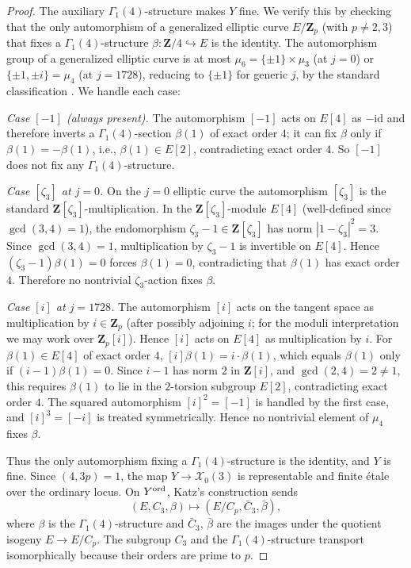 \documentclass[11pt]{amsart}
\theoremstyle{definition}
\theoremstyle{remark}
\newcommand{\Z}{\mathbf{Z}}
\begin{document}
\begin{proof}
The auxiliary $\Gamma_1(4)$-structure makes $Y$ fine. We verify this by checking that the only automorphism of a generalized elliptic curve $E/\Z_p$ (with $p\ne 2,3$) that fixes a $\Gamma_1(4)$-structure $\beta:\Z/4\hookrightarrow E$ is the identity. The automorphism group of a generalized elliptic curve is at most $\mu_6=\{\pm 1\}\times\mu_3$ (at $j=0$) or $\{\pm 1,\pm i\}=\mu_4$ (at $j=1728$), reducing to $\{\pm 1\}$ for generic $j$, by the standard classification \cite[\S 2.7]{KM85}. We handle each case:

\emph{Case $[-1]$ (always present).} The automorphism $[-1]$ acts on $E[4]$ as $-\mathrm{id}$ and therefore inverts a $\Gamma_1(4)$-section $\beta(1)$ of exact order $4$; it can fix $\beta$ only if $\beta(1)=-\beta(1)$, i.e., $\beta(1)\in E[2]$, contradicting exact order $4$. So $[-1]$ does not fix any $\Gamma_1(4)$-structure.

\emph{Case $[\zeta_3]$ at $j=0$.} On the $j=0$ elliptic curve the automorphism $[\zeta_3]$ is the standard $\Z[\zeta_3]$-multiplication. In the $\Z[\zeta_3]$-module $E[4]$ (well-defined since $\gcd(3,4)=1$), the endomorphism $\zeta_3-1\in\Z[\zeta_3]$ has norm $|1-\zeta_3|^2=3$. Since $\gcd(3,4)=1$, multiplication by $\zeta_3-1$ is invertible on $E[4]$. Hence $(\zeta_3-1)\beta(1)=0$ forces $\beta(1)=0$, contradicting that $\beta(1)$ has exact order $4$. Therefore no nontrivial $\zeta_3$-action fixes $\beta$.

\emph{Case $[i]$ at $j=1728$.} The automorphism $[i]$ acts on the tangent space as multiplication by $i\in\Z_p$ (after possibly adjoining $i$; for the moduli interpretation we may work over $\Z_p[i]$). Hence $[i]$ acts on $E[4]$ as multiplication by $i$. For $\beta(1)\in E[4]$ of exact order $4$, $[i]\beta(1)=i\cdot\beta(1)$, which equals $\beta(1)$ only if $(i-1)\beta(1)=0$. Since $i-1$ has norm $2$ in $\Z[i]$, and $\gcd(2,4)=2\ne 1$, this requires $\beta(1)$ to lie in the $2$-torsion subgroup $E[2]$, contradicting exact order $4$. The squared automorphism $[i]^2=[-1]$ is handled by the first case, and $[i]^3=[-i]$ is treated symmetrically. Hence no nontrivial element of $\mu_4$ fixes $\beta$.

Thus the only automorphism fixing a $\Gamma_1(4)$-structure is the identity, and $Y$ is fine. Since $(4,3p)=1$, the map $Y\to\mathcal X_0(3)$ is representable and finite étale over the ordinary locus. On $Y^{\rm ord}$, Katz's construction sends
\[
(E,C_3,\beta)\longmapsto(E/C_p,\bar C_3,\bar\beta),
\]
where $\beta$ is the $\Gamma_1(4)$-structure and $\bar C_3$, $\bar\beta$ are the images under the quotient isogeny $E\to E/C_p$. The subgroup $C_3$ and the $\Gamma_1(4)$-structure transport isomorphically because their orders are prime to $p$.


\end{proof}
\end{document}
